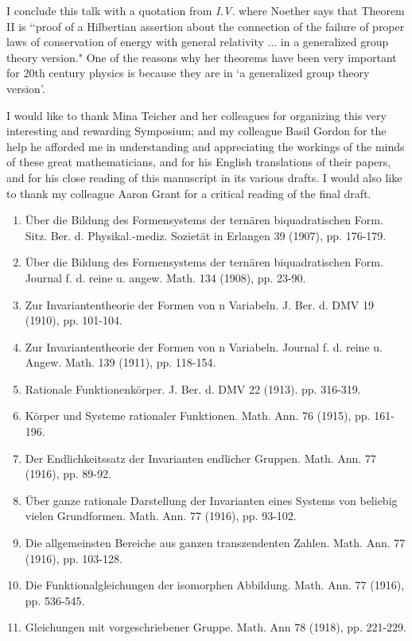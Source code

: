 I conclude this talk with a quotation from {\it{I.V.}} where
    Noether says that  Theorem II is  \lq\lq  proof
of a Hilbertian assertion about the connection of the failure of
proper laws of conservation of energy with general relativity ... in
a generalized
group theory version."  One of the reasons why her theorems have been very important for 20th century  physics is because they are in `a generalized group theory version'.

\acknowledgements
I would like to thank Mina Teicher and her colleagues for organizing this very interesting and rewarding Symposium; and my colleague Basil Gordon for the help he afforded me in understanding and appreciating the workings of the minds of these
great mathematicians, and for his English translations of their papers,
and for his close reading of this manuscript in its various drafts. 
I would also like to thank my colleague Aaron Grant for a critical reading of
the final draft.
\newpage
{}

\begin{enumerate}
\item{} \"Uber die Bildung des Formensystems der tern\"aren 
biquadratischen Form.
  Sitz. Ber. d. Physikal.-mediz. Soziet\"at in Erlangen 39
 (1907), pp. 176-179.
\item{}  \"Uber die Bildung des Formensystems der tern\"aren 
biquadratischen Form.
   Journal f. d. reine u. angew. Math. 134 (1908),
 pp. 23-90.
\item{} Zur Invariantentheorie der Formen von n Variabeln.
  J. Ber. d. DMV 19 (1910), pp. 101-104.
\item{} Zur Invariantentheorie der Formen von n Variabeln.
  Journal f. d. reine u. Angew. Math. 139 (1911), pp. 118-154.
\item{} Rationale Funktionenk\"orper.
J. Ber. d. DMV 22 (1913). pp. 316-319.
\item{} K\"orper und Systeme rationaler Funktionen.
  Math. Ann. 76 (1915), pp. 161-196.
\item{} Der Endlichkeitssatz der Invarianten endlicher Gruppen.
  Math. Ann. 77 (1916), pp. 89-92.
\item{} \"Uber ganze rationale Darstellung der Invarianten
 eines Systems von beliebig vielen Grundformen.
  Math. Ann. 77 (1916), pp. 93-102. 
 \item{} Die allgemeinsten Bereiche aus ganzen 
 transzendenten Zahlen.
  Math. Ann. 77 (1916), pp. 103-128. 
 \item{} Die Funktionalgleichungen der isomorphen Abbildung.
  Math. Ann. 77 (1916), pp. 536-545.
 \item{} Gleichungen mit vorgeschriebener Gruppe.
  Math. Ann 78 (1918), pp. 221-229. 

\end{enumerate}
\newpage


